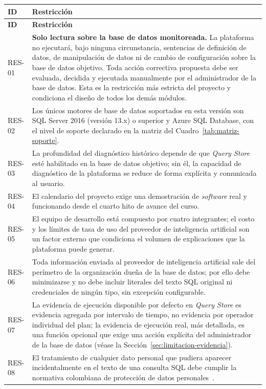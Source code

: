 \documentclass[11pt,a4paper]{report}
\begin{document}
\begin{xltabular}{\linewidth}{@{}p{1.6cm}X@{}}
\toprule
\textbf{ID} & \textbf{Restricci\'on} \\
\midrule
\endfirsthead
\toprule
\textbf{ID} & \textbf{Restricci\'on} \\
\midrule
\endhead
\bottomrule
\endlastfoot
RES-01 & \textbf{Solo lectura sobre la base de datos monitoreada.} La plataforma no ejecutar\'a, bajo ninguna circunstancia, sentencias de definici\'on de datos, de manipulaci\'on de datos ni de cambio de configuraci\'on sobre la base de datos objetivo. Toda acci\'on correctiva propuesta debe ser evaluada, decidida y ejecutada manualmente por el administrador de la base de datos. Esta es la restricci\'on m\'as estricta del proyecto y condiciona el dise\~no de todos los dem\'as m\'odulos. \\
RES-02 & Los \'unicos motores de base de datos soportados en esta versi\'on son SQL Server 2016 (versi\'on 13.x) o superior y Azure SQL Database, con el nivel de soporte declarado en la matriz del Cuadro~\ref{tab:matriz-soporte}. \\
RES-03 & La profundidad del diagn\'ostico hist\'orico depende de que \textit{Query Store} est\'e habilitado en la base de datos objetivo; sin \'el, la capacidad de diagn\'ostico de la plataforma se reduce de forma expl\'icita y comunicada al usuario. \\
RES-04 & El calendario del proyecto exige una demostraci\'on de \textit{software} real y funcionando desde el cuarto hito de avance del curso. \\
RES-05 & El equipo de desarrollo est\'a compuesto por cuatro integrantes; el costo y los l\'imites de tasa de uso del proveedor de inteligencia artificial son un factor externo que condiciona el volumen de explicaciones que la plataforma puede generar. \\
RES-06 & Toda informaci\'on enviada al proveedor de inteligencia artificial sale del per\'imetro de la organizaci\'on due\~na de la base de datos; por ello debe minimizarse y no debe incluir literales del texto SQL original ni credenciales de ning\'un tipo, sin excepci\'on configurable. \\
RES-07 & La evidencia de ejecuci\'on disponible por defecto en \textit{Query Store} es evidencia agregada por intervalo de tiempo, no evidencia por operador individual del plan; la evidencia de ejecuci\'on real, m\'as detallada, es una funci\'on opcional que exige una acci\'on expl\'icita del administrador de la base de datos (v\'ease la Secci\'on~\ref{sec:limitacion-evidencia}). \\
RES-08 & El tratamiento de cualquier dato personal que pudiera aparecer incidentalmente en el texto de una consulta SQL debe cumplir la normativa colombiana de protecci\'on de datos personales~\cite{R14}. \\
\end{xltabular}
\end{document}
